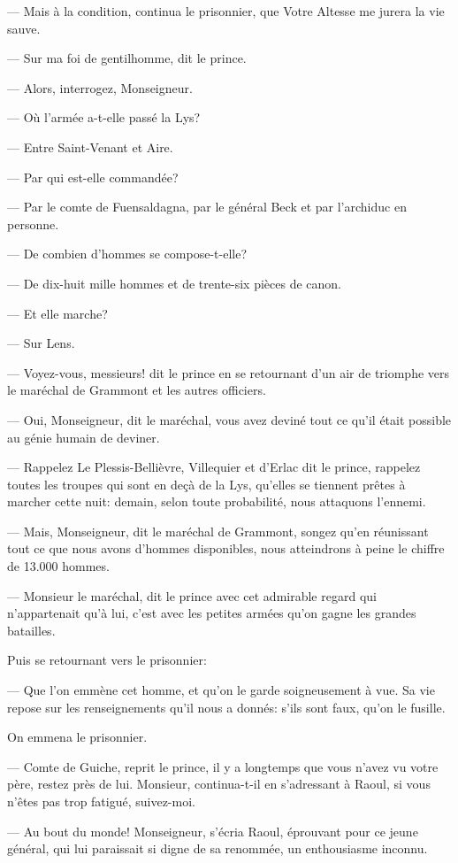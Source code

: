 — Mais à la condition, continua le prisonnier, que Votre Altesse me jurera la vie sauve.

— Sur ma foi de gentilhomme, dit le prince.

— Alors, interrogez, Monseigneur.

— Où l'armée a-t-elle passé la Lys?

— Entre Saint-Venant et Aire.

— Par qui est-elle commandée?

— Par le comte de Fuensaldagna, par le général Beck et par l'archiduc en personne.

— De combien d'hommes se compose-t-elle?

— De dix-huit mille hommes et de trente-six pièces de canon.

— Et elle marche?

— Sur Lens.

— Voyez-vous, messieurs! dit le prince en se retournant d'un air de triomphe vers le maréchal de Grammont et les autres officiers.

— Oui, Monseigneur, dit le maréchal, vous avez deviné tout ce qu'il était possible au génie humain de deviner.

— Rappelez Le Plessis-Bellièvre, Villequier et d'Erlac dit le prince, rappelez toutes les troupes qui sont en deçà de la Lys, qu'elles se tiennent prêtes à marcher cette nuit: demain, selon toute probabilité, nous attaquons l'ennemi.

— Mais, Monseigneur, dit le maréchal de Grammont, songez qu'en réunissant tout ce que nous avons d'hommes disponibles, nous atteindrons à peine le chiffre de 13.000 hommes.

— Monsieur le maréchal, dit le prince avec cet admirable regard qui n'appartenait qu'à lui, c'est avec les petites armées qu'on gagne les grandes batailles.

Puis se retournant vers le prisonnier:

— Que l'on emmène cet homme, et qu'on le garde soigneusement à vue. Sa vie repose sur les renseignements qu'il nous a donnés: s'ils sont faux, qu'on le fusille.

On emmena le prisonnier.

— Comte de Guiche, reprit le prince, il y a longtemps que vous n'avez vu votre père, restez près de lui. Monsieur, continua-t-il en s'adressant à Raoul, si vous n'êtes pas trop fatigué, suivez-moi.

— Au bout du monde! Monseigneur, s'écria Raoul, éprouvant pour ce jeune général, qui lui paraissait si digne de sa renommée, un enthousiasme inconnu.

